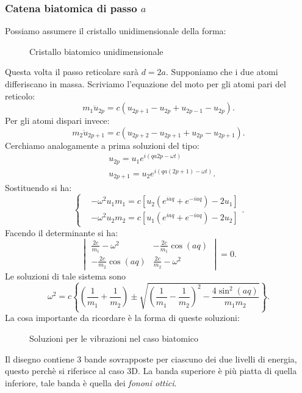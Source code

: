 \subsubsection{Catena biatomica di passo $a$}
\label{subsubsec:Catena biatomica di passo $a$}
Possiamo assumere il cristallo unidimensionale della forma:
\begin{figure}[H]
    \centering
    \caption{Cristallo biatomico unidimensionale}
    \label{fig:cristallo-biatomico-unidimensionale}
\end{figure}
\noindent 
Questa volta il passo reticolare sarà $d = 2a$. Supponiamo che i due atomi differiscano in massa.
Scriviamo l'equazione del moto per gli atomi pari del reticolo:
\[
	m_1 \ddot{u}_{2p} 
	=
	c \left( u_{2p +1} - u_{2p} + u_{2p -1} - u_{2p} \right) 
.\] 
Per gli atomi dispari invece:
\[
	m_2 \ddot{u}_{2p+1} 
	=
	c \left( u_{2p +2} - u_{2p+1} + u_{2p} - u_{2p+1} \right) 
.\] 
Cerchiamo analogamente a prima soluzioni del tipo:
\[\begin{aligned}
	&u_{2p} = u_1 e^{i\left( qa2p -\omega t \right) }\\
	&u_{2p+1} = u_2 e^{i\left( qa\left( 2p+1 \right)  -\omega t \right) }
.\end{aligned}\]
Sostituendo si ha:
\[
	\begin{cases}
		&-\omega^2u_1m_1= c\left[u_2\left(e^{iaq}+e^{-iaq}\right)-2 u_1 \right] \\
		&-\omega^2u_2m_2= c\left[u_1\left(e^{iaq}+e^{-iaq}\right)-2 u_2 \right] 
	\end{cases}
.\] 
Facendo il determinante si ha:
\[
	\begin{vmatrix}
		\frac{2c}{m_1}-\omega ^2 & - \frac{2c}{m_1} \cos(aq) \\
		-\frac{2c}{m_2}\cos(aq) & \frac{2c}{m_2} - \omega ^2
	\end{vmatrix}
	= 0
.\] 
Le soluzioni di tale sistema sono 
\[
	\omega ^2 
	=
	c\left\{ \left( \frac{1}{m_1} + \frac{1}{m_2} \right) 
	\pm \sqrt{\left( \frac{1}{m_1} - \frac{1}{m_2} \right) ^2 
	-\frac{4\sin^2(aq)}{m_1m_2} }  \right\} 
.\] 
La cosa importante da ricordare è la forma di queste soluzioni:
\begin{figure}[H]
    \centering
    \caption{Soluzioni per le vibrazioni nel caso biatomico}
    \label{fig:soluzioni-per-le-vibrazioni-nel-caso-biatomico}
\end{figure}
\noindent
Il disegno contiene 3 bande sovrapposte per ciascuno dei due livelli di energia, questo perchè si riferisce al caso 3D. La banda superiore è più piatta di quella inferiore, tale banda è quella dei \textit{fononi ottici}. 
